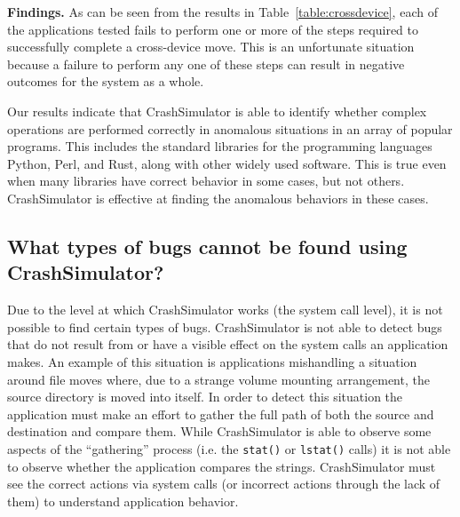 {\bf Findings.}
As can be seen from the results in Table~\ref{table:crossdevice}, each of the
applications tested fails to perform one or more of the steps required to
successfully complete a cross-device move.  This is an unfortunate situation
because a failure to perform any one of these steps can result in negative
outcomes for the system as a whole.

Our results indicate that CrashSimulator is able to identify whether complex
operations are performed correctly in anomalous situations in
an array of popular programs.  
This includes the standard libraries for the programming languages Python,
Perl, and Rust, along with other widely used software.  This is true even
when many libraries have correct behavior in some cases, but not others.
CrashSimulator is effective at finding the anomalous behaviors in these
cases.

\subsection{What types of bugs cannot be found using CrashSimulator?}
\label{sec-not-found}

Due to the level at which CrashSimulator works (the system call
level), it is not possible to find certain types of bugs.
CrashSimulator is not able to detect bugs that do not result from or
have a visible effect on the system calls an application makes.  An
example of this situation is applications mishandling a situation
around file moves where, due to a strange volume mounting arrangement,
the source directory is moved into itself.  In order to detect this
situation the application must make an effort to gather the full path
of both the source and destination and compare them.  While
CrashSimulator is able to observe some aspects of the ``gathering''
process (i.e. the {\tt stat()} or {\tt lstat()} calls) it is not able
to observe whether the application compares the strings.
CrashSimulator must see the correct actions via system calls (or
incorrect actions through the lack of them) to understand application
behavior.

